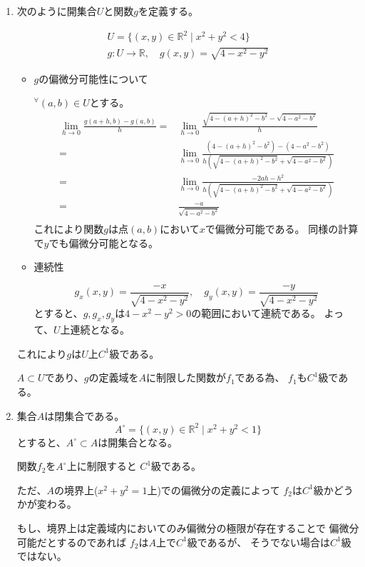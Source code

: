 \documentclass[12pt,b5paper]{ltjsarticle}
\begin{document}
\hrulefill

\begin{enumerate}
 \item 
次のように開集合$U$と関数$g$を定義する。

\begin{gather}
 U=\{ (x,y)\in\mathbb{R}^2 \mid x^2+y^2 < 4 \}\\
 g : U \rightarrow \mathbb{R} , \quad g(x,y)=\sqrt{4-x^2-y^2}
\end{gather}
\begin{itemize}
 \item 
$g$の偏微分可能性について

${}^{\forall} (a,b)\in U$とする。
\begin{align}
 \lim_{h\rightarrow 0}\frac{g(a+h,b)-g(a,b)}{h}
 =& \lim_{h\rightarrow 0}\frac{\sqrt{4-(a+h)^2-b^2}-\sqrt{4-a^2-b^2}}{h}\\
 =& \lim_{h\rightarrow 0}\frac{(4-(a+h)^2-b^2)-(4-a^2-b^2)}{h(\sqrt{4-(a+h)^2-b^2}+\sqrt{4-a^2-b^2})}\\
 =& \lim_{h\rightarrow 0}\frac{-2ah-h^2}{h(\sqrt{4-(a+h)^2-b^2}+\sqrt{4-a^2-b^2})}\\
 =& \frac{-a}{\sqrt{4-a^2-b^2}}\\
\end{align}
これにより関数$g$は点$(a,b)$において$x$で偏微分可能である。
同様の計算で$y$でも偏微分可能となる。

 \item
連続性

\begin{equation}
 g_x(x,y)= \frac{-x}{\sqrt{4-x^2-y^2}}, \quad g_y(x,y)= \frac{-y}{\sqrt{4-x^2-y^2}}
\end{equation}
とすると、$g,g_x,g_y$は$4-x^2-y^2>0$の範囲において連続である。
よって、$U$上連続となる。
\end{itemize}
これにより$g$は$U$上$C^1$級である。

$A\subset U$であり、$g$の定義域を$A$に制限した関数が$f_1$である為、
$f_1$も$C^1$級である。

 \item
      集合$A$は閉集合である。
      \begin{equation}
       A^{\circ} =\{ (x,y)\in\mathbb{R}^2 \mid x^2+y^2<1\}
      \end{equation}
      とすると、$A^{\circ}\subset A$は開集合となる。

      関数$f_2$を$A^{\circ}$上に制限すると
      $C^1$級である。

      ただ、$A$の境界上($x^2+y^2=1$上)での偏微分の定義によって
      $f_2$は$C^1$級かどうかが変わる。

      もし、境界上は定義域内においてのみ偏微分の極限が存在することで
      偏微分可能だとするのであれば
      $f_2$は$A$上で$C^1$級であるが、
      そうでない場合は$C^1$級ではない。
\end{enumerate}
\end{document}
